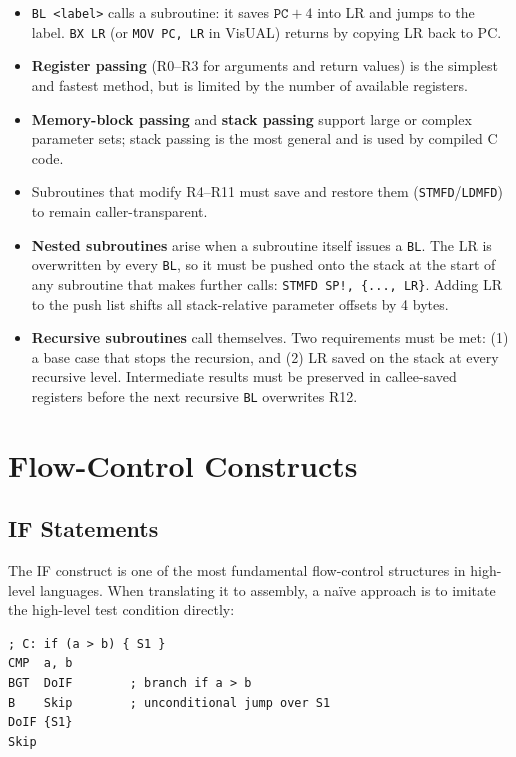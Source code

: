 \documentclass[11pt, a4paper, notitlepage]{report}
\theoremstyle{definition}
\theoremstyle{remark}
\theoremstyle{definition}
\begin{document}
\begin{itemize}
  \item \texttt{BL <label>} calls a subroutine: it saves $\texttt{PC}+4$ into LR and jumps to the label. \texttt{BX LR} (or \texttt{MOV PC, LR} in VisUAL) returns by copying LR back to PC\@.
  \item \textbf{Register passing} (R0--R3 for arguments and return values) is the simplest and fastest method, but is limited by the number of available registers.
  \item \textbf{Memory-block passing} and \textbf{stack passing} support large or complex parameter sets; stack passing is the most general and is used by compiled C code.
  \item Subroutines that modify R4--R11 must save and restore them (\texttt{STMFD}/\texttt{LDMFD}) to remain caller-transparent.
  \item \textbf{Nested subroutines} arise when a subroutine itself issues a \texttt{BL}. The LR is overwritten by every \texttt{BL}, so it must be pushed onto the stack at the start of any subroutine that makes further calls: \texttt{STMFD SP!, \{..., LR\}}. Adding LR to the push list shifts all stack-relative parameter offsets by 4 bytes.
  \item \textbf{Recursive subroutines} call themselves. Two requirements must be met: (1) a base case that stops the recursion, and (2) LR saved on the stack at every recursive level. Intermediate results must be preserved in callee-saved registers before the next recursive \texttt{BL} overwrites R12.
\end{itemize}

\chapter{Flow-Control Constructs}

\section{IF Statements}

The IF construct is one of the most fundamental flow-control structures in high-level languages. When translating it to assembly, a na\"ive approach is to imitate the high-level test condition directly:

\begin{lstlisting}
; C: if (a > b) { S1 }
CMP  a, b
BGT  DoIF        ; branch if a > b
B    Skip        ; unconditional jump over S1
DoIF {S1}
Skip
\end{lstlisting}
\end{document}
